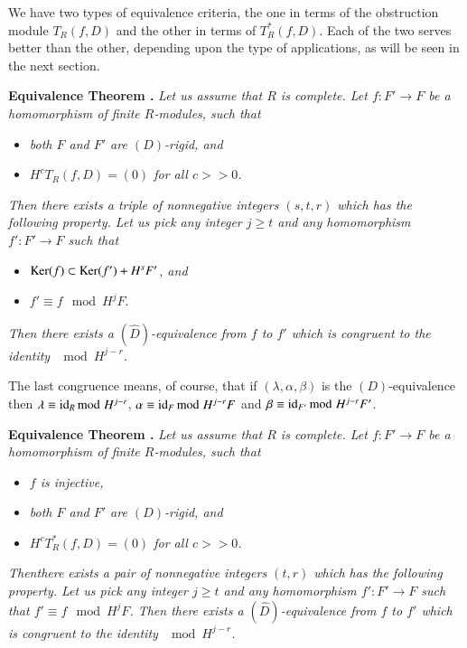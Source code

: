 We have two types of equivalence criteria, the one in terms of the obstruction module $T_{R}(f,D)$ and the other in terms of $T^{*}_{R}(f,D)$. Each of the two serves better than the other, depending upon the type of applications, as will be seen in the next section.

\medskip
\noindent
{\bf Equivalence Theorem .\label{art10-sec2-eqthm-I}}
{\em Let us assume that $R$ is complete. Let $f:F'\to F$ be a homomorphism of finite $R$-modules, such that}
\begin{itemize}
\item[\rm(i)] {\em both $F$ and $F'$ are $(D)$-rigid, and}

\item[\rm(ii)] {\em $H^{c}T_{R}(f,D)=(0)$ for all $c>>0$.}
\end{itemize}

{\em Then there exists a triple of nonnegative integers $(s,t,r)$ which has the following property. Let us pick any integer $j\geq t$ and any homomorphism $f':F'\to F$ such that}
\begin{itemize}
\item[\rm(a)] {\em $\operatorname{\mathrm{Ker}} (f)\subset \operatorname{\mathrm{Ker}}(f')+H^{s}F'$, and}

\item[\rm(b)] $f'\equiv f\mod H^{j}F$.
\end{itemize}

{\em Then there exists a $(\widehat{D})$-equivalence from $f$ to $f'$ which is congruent to the identity $\mod H^{j-r}$.}
\smallskip

The last congruence means, of course, that if $(\lambda,\alpha,\beta)$ is the $(D)$-equivalence then $\lambda\equiv \operatorname{\mathrm{id}}_{R}{\rm{mod}}\kern.3em H^{j-r}$, $\alpha\equiv \operatorname{\mathrm{id}}_{F}{\rm{mod}}\kern.3em H^{j-r}F$ and $\beta\equiv \operatorname{\mathrm{id}}_{F'}{\rm{mod}}\kern.3em H^{j-r}F'$.

\medskip
\noindent
{\bf Equivalence Theorem .\label{art10-sec2-eqthm-II}}
{\em Let us assume that $R$ is complete. Let $f:F'\to F$ be a homomorphism of finite $R$-modules, such that}
\begin{itemize}
\item[\rm(i)] {\em $f$ is injective,}

\item[\rm(ii)] {\em both $F$ and $F'$ are $(D)$-rigid, and}

\item[\rm(iii)] {\em $H^{c}T^{*}_{R}(f,D)=(0)$ for all $c>>0$.}
\end{itemize}

{\em Then\pageoriginale there exists a pair of nonnegative integers $(t,r)$ which has the following property. Let us pick any integer $j\geq t$ and any homomorphism $f':F'\to F$ such that $f'\equiv f\mod H^{j}F$. Then there exists a $(\widehat{D})$-equivalence from $f$ to $f'$ which is congruent to the identity $\mod H^{j-r}$.}

